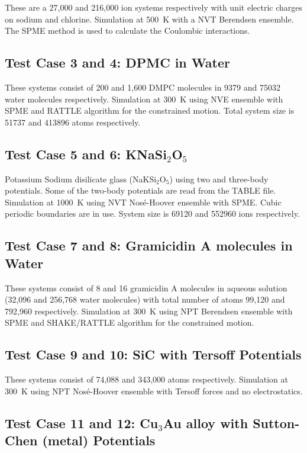 These are a 27,000 and 216,000 ion systems respectively with unit
electric charges on sodium and chlorine.  Simulation at 500~K with a
NVT Berendsen ensemble.  The SPME method is used to calculate the
Coulombic interactions.

\subsection{Test Case 3 and 4: DPMC in Water}

These systems consist of 200 and 1,600 DMPC molecules in 9379 and
75032 water molecules respectively.  Simulation at 300~K using NVE
ensemble with SPME and RATTLE algorithm for the constrained motion.
Total system size is 51737 and 413896 atoms respectively.

\subsection{Test Case 5 and 6: KNaSi$_{2}$O$_{5}$}

Potassium Sodium disilicate glass (NaKSi$_{2}$O$_{5}$) using two and
three-body potentials.  Some of the two-body potentials are read
from the TABLE file.  Simulation at 1000~K using NVT Nos\'e-Hoover ensemble
with SPME.  Cubic periodic boundaries are in use. System size is
69120 and 552960 ions respectively.

\subsection{Test Case 7 and 8: Gramicidin A molecules in Water}

These systems consist of 8 and 16 gramicidin A molecules in aqueous
solution (32,096 and 256,768 water molecules) with total number of
atoms 99,120 and 792,960 respectively.  Simulation at 300~K using
NPT Berendsen ensemble with SPME and SHAKE/RATTLE algorithm for the
constrained motion.

\subsection{Test Case 9 and 10: SiC with Tersoff Potentials}

These systems consist of 74,088 and 343,000 atoms respectively.
Simulation at 300~K using NPT Nos\'e-Hoover ensemble with Tersoff forces
and no electrostatics.

\subsection{Test Case 11 and 12: Cu$_{3}$Au alloy with Sutton-Chen (metal) Potentials}

